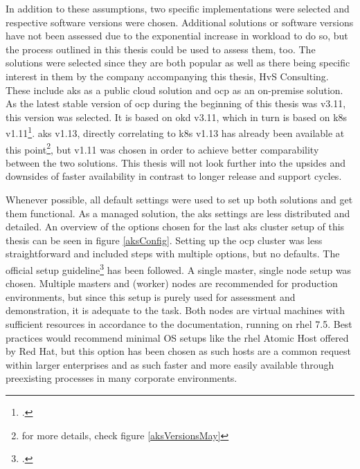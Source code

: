 In addition to these assumptions, two specific implementations were selected and respective software versions were chosen. Additional solutions or software versions have not been assessed due to the exponential increase in workload to do so, but the process outlined in this thesis could be used to assess them, too.
The solutions were selected since they are both popular as well as there being specific interest in them by the company accompanying this thesis, HvS Consulting.
These include \gls{aks} as a public cloud solution and \gls{ocp} as an on-premise solution. As the latest stable version of \gls{ocp} during the beginning of this thesis was v3.11, this version was selected. It is based on \gls{okd} v3.11, which in turn is based on \gls{k8s} v1.11\footcite[][, refer to the second table below the headline 'Platform Components']{ocpK8sVersions}. \gls{aks} v1.13, directly correlating to \gls{k8s} v1.13 has already been available at this point\footnote{for more details, check figure \ref{aksVersionsMay}}, but v1.11 was chosen in order to achieve better comparability between the two solutions. This thesis will not look further into the upsides and downsides of faster availability in contrast to longer release and support cycles.

Whenever possible, all default settings were used to set up both solutions and get them functional. 
As a managed solution, the \gls{aks} settings are less distributed and detailed. An overview of the options chosen for the last \gls{aks} cluster setup of this thesis can be seen in figure \ref{aksConfig}.
Setting up the \gls{ocp} cluster was less straightforward and included steps with multiple options, but no defaults. The official setup guideline\footcite[][, sections 'Planning your installation' to 'Installing OpenShift']{ocpSetup} has been followed. A single master, single node setup was chosen. Multiple masters and (worker) nodes are recommended for production environments, but since this setup is purely used for assessment and demonstration, it is adequate to the task. Both nodes are virtual machines with sufficient resources in accordance to the documentation, running on \gls{rhel} 7.5. Best practices would recommend minimal OS setups like the \gls{rhel} Atomic Host offered by Red Hat, but this option has been chosen as such hosts are a common request within larger enterprises and as such faster and more easily available through preexisting processes in many corporate environments.

\newpage
